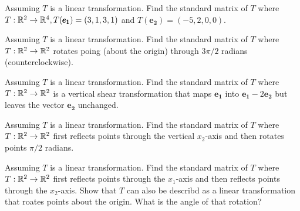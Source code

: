 \documentclass{../mathhomework}
\newcommand{\Vect}[1]{\pmb{#1}}
\begin{document}
\maketitle

\pagebreak


\begin{problem}[1.9\#1]
    Assuming $T$ is a linear transformation. Find the standard matrix of $T$ where $T:\R^2 \to \R^4, T(\Vect{e_1}) = (3,1,3,1)$ and $T(\Vect{e_2}) = (-5,2,0,0)$.
\end{problem}

\begin{problem}[1.9\#3]
    Assuming $T$ is a linear transformation. Find the standard matrix of $T$ where $T:\mathbb{R}^2 \to \mathbb{R}^2$ rotates poing (about the origin) through $3\pi / 2$ radians (counterclockwise).
\end{problem}

\begin{problem}[1.9\#5]
    Assuming $T$ is a linear transformation. Find the standard matrix of $T$ where $T:\mathbb{R}^2 \to \mathbb{R}^2$ is a vertical shear transformation that maps $\Vect{e_1}$ into $\Vect{e_1} - 2\Vect{e_2}$ but leaves the vector $\Vect{e_2}$ unchanged.
\end{problem}

\begin{problem}[1.9\#10]
    Assuming $T$ is a linear transformation. Find the standard matrix of $T$ where $T:\mathbb{R}^2 \to \mathbb{R}^2$ first reflects points through the vertical $x_2$-axis and then rotates points $\pi / 2$ radians.
\end{problem}

\begin{problem}[1.9\#11]
    Assuming $T$ is a linear transformation. Find the standard matrix of $T$ where $T:\mathbb{R}^2 \to \mathbb{R}^2$ first reflects points through the $x_1$-axis and then reflects points through the $x_2$-axis.
    Show that $T$ can also be describd as a linear transformation that roates points about the origin. What is the angle of that rotation?
\end{problem}
\end{document}
